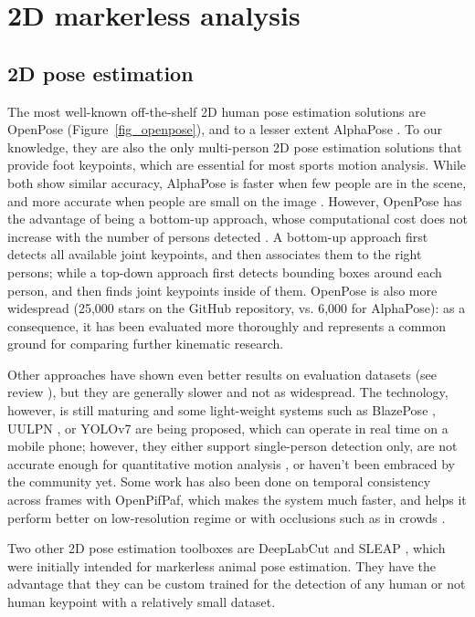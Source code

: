 \FloatBarrier
\section{2D markerless analysis}
\subsection{2D pose estimation}

The most well-known off-the-shelf 2D human pose estimation solutions are OpenPose \cite{Cao2019} (Figure~\ref{fig_openpose}), and to a lesser extent AlphaPose \cite{Fang2017}. To our knowledge, they are also the only multi-person 2D pose estimation solutions that provide foot keypoints, which are essential for most sports motion analysis. While both show similar accuracy, AlphaPose is faster when few people are in the scene, and more accurate when people are small on the image \cite{Hidalgo2019}. However, OpenPose has the advantage of being a bottom-up approach, whose computational cost does not increase with the number of persons detected \cite{Cao2019}. A bottom-up approach first detects all available joint keypoints, and then associates them to the right persons; while a top-down approach first detects bounding boxes around each person, and then finds joint keypoints inside of them. OpenPose is also more widespread (25,000 stars on the GitHub repository, vs. 6,000 for AlphaPose): as a consequence, it has been evaluated more thoroughly and represents a common ground for comparing further kinematic research. 

Other approaches have shown even better results on evaluation datasets (see review \cite{Chen2020a}), but they are generally slower and not as widespread. The technology, however, is still maturing and some light-weight systems such as BlazePose \cite{Bazarevsky2020}, UULPN \cite{Wang2022a}, or YOLOv7 \cite{Wang2022b} are being proposed, which can operate in real time on a mobile phone; however, they either support single-person detection only, are not accurate enough for quantitative motion analysis \cite{Mroz2021}, or haven't been embraced by the community yet. Some work has also been done on temporal consistency across frames with OpenPifPaf, which makes the system much faster, and helps it perform better on low-resolution regime or with occlusions such as in crowds \cite{Kreiss2021}.

Two other 2D pose estimation toolboxes are DeepLabCut \cite{Mathis2018,Lauer2022} and SLEAP \cite{Pereira2022}, which were initially intended for markerless animal pose estimation. They have the advantage that they can be custom trained for the detection of any human or not human keypoint with a relatively small dataset. 

